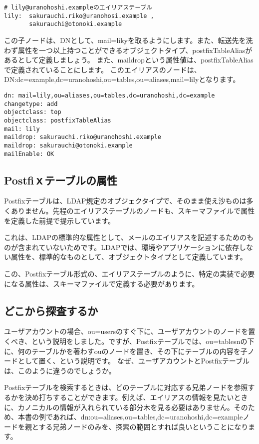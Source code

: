 \begin{verbatim}
# lily@uranohoshi.exampleのエイリアステーブル
lily:  sakurauchi.riko@uranohosi.example , 
       sakurauchi@otonoki.example
\end{verbatim}

この子ノードは、DNとして、mail=likyを取るようにします。また、転送先を洗わず属性を一つ以上持つことができるオブジェクトタイプ、postfixTableAliasがあるとして定義しましょう。
また、maildropという属性値は、postfixTableAliasで定義されていることにします。
このエイリアスのノードは、DN:dc=example,dc=uranohoshi,ou=tables,ou=aliases,mail=lilyとなります。

\begin{verbatim}
dn: mail=lily,ou=aliases,ou=tables,dc=uranohoshi,dc=example
changetype: add
objectclass: top
objectclass: postfixTableAlias
mail: lily
maildrop: sakurauchi.riko@uranohoshi.example
maildrop: sakurauchi@otonoki.example
mailEnable: OK
\end{verbatim}

\subsection{Postfiｘテーブルの属性}

Postfixテーブルは、LDAP規定のオブジェクタイプで、そのまま使え沙ものは多くありません。先程のエイリアステーブルのノードも、スキーマファイルで属性を定義した前提で提示しています。

これは、LDAPの標準的な属性として、メールのエイリアスを記述するためのものが含まれていないためです。LDAPでは、環境やアプリケーションに依存しない属性を、標準的なものとして、オブジェクトタイプとして定義しています。

この、Postfixテーブル形式の、エイリアステーブルのように、特定の実装で必要になる属性は、スキーマファイルで定義する必要があります。

\subsection{どこから探査するか}

ユーザアカウントの場合、ou=usersのすぐ下に、ユーザアカウントのノードを置くべき、という説明をしました。ですが、Postfixテーブルでは、ou=tablesnの下に、何のテーブルかを著わすouのノードを置き、その下にテーブルの内容を子ノードとして置く、という説明です。
なぜ、ユーザアカウントとPostfixテーブルは、このように違うのでしょうか。

Postfixテーブルを検索するときは、どのテーブルに対応する兄弟ノードを参照するかを決め打ちすることができます。例えば、エイリアスの情報を見たいときに、カノニカルの情報が入れられている部分木を見る必要はありません。そのため、本書の例であれば、dn:ou=aliases,ou=tables,dc=uranohoshi,dc=exampleノードを親とする兄弟ノードのみを、探索の範囲とすれば良いということになります。

